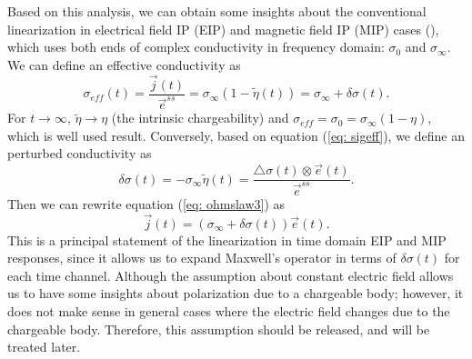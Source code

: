 \documentclass[a4paper, 11pt]{article}
\newcommand{\siginf}{\sigma_\infty}
\newcommand{\dsig}{\triangle\sigma}
\renewcommand {\j}  { {\vec j} }
\newcommand {\e}  { {\vec e} }
\newcommand{\peta}{\tilde{\eta}}
\newcommand{\sigpert}{\delta\sigma}
\begin{document}
Based on this analysis, we can obtain some insights about the conventional linearization in electrical field IP (EIP) and magnetic field IP (MIP) cases (\cite{seigel1959,seigel1974}), which uses both ends of complex conductivity in frequency domain: $\sigma_0$ and $\siginf$. We can define an effective conductivity as
\begin{equation}
	\sigma_{eff}(t) = \frac{\j(t)}{\e^{ss}} = \siginf(1-\peta(t)) = \siginf + \delta\sigma(t).
  \label{eq: sigeff}
\end{equation}
For $t \rightarrow \infty$, $\peta\rightarrow \eta$ (the intrinsic chargeability) and $\sigma_{eff} = \sigma_0 = \siginf(1-\eta)$, which is well used result.
Conversely, based on equation (\ref{eq: sigeff}), we define an perturbed conductivity as
\begin{equation}
  \delta\sigma(t) = -\siginf\peta(t) =\frac{\dsig(t)\otimes \e(t)}{\e^{ss}}.
  \label{eq: sigpert}
\end{equation}
Then we can rewrite equation (\ref{eq: ohmslaw3}) as
\begin{equation}
  \j(t) = (\siginf + \delta\sigma(t))\e(t).
\end{equation}
This is a principal statement of the linearization in time domain EIP and MIP responses, since it allows us to expand Maxwell's operator in terms of $\sigpert(t)$ for each time channel. Although the assumption about constant electric field allows us to have some insights about polarization due to a chargeable body; however, it does not make sense in general cases where the electric field changes due to the chargeable body. Therefore, this assumption should be released, and will be treated later.
\end{document}

